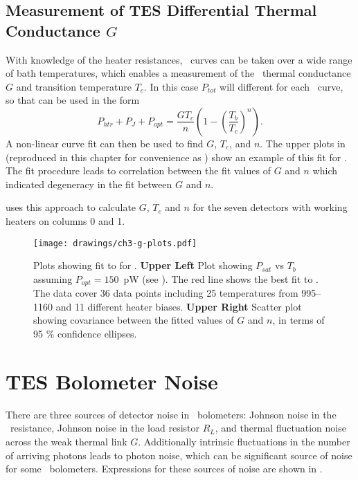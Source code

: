 \subsection{Measurement of \textsc{TES} Differential Thermal Conductance $G$}

With knowledge of the heater resistances, \IV\ curves can be taken over a wide range of bath temperatures, which enables a measurement of the \TES\ thermal conductance $G$ and transition temperature $T_c$.
In this case $P_{tot}$ will different for each \IV\ curve, so that  can be used in the form
\begin{equation}\label{eqn:ch3-g-fit}
P_{htr} + P_J + P_{opt}= \frac{G T_c}{n}\left(1 - \left(\frac{T_b}{T_c}\right)^n\right).
\end{equation}
A non-linear curve fit can then be used to find $G$, $T_c$, and $n$.
The upper plots in  (reproduced in this chapter for convenience as ) show an example of this fit for .
The fit procedure leads to correlation between the fit values of $G$ and $n$ which indicated degeneracy in the fit between $G$ and $n$.

 uses this approach to calculate $G$, $T_c$ and $n$ for the seven detectors with working heaters on columns 0 and 1.

\begin{figure*}
\texttt{[image: drawings/ch3-g-plots.pdf]}
\caption{Plots showing fit to  for .
\textbf{Upper Left} Plot showing $P_{sat}$ vs $T_b$ assuming $P_{opt} = 150$~pW (see ).
The red line shows the best fit to .
The data cover 36 data points including 25 temperatures from \SIrange{995}{1160}{\mK} and 11 different heater biases.
\textbf{Upper Right} Scatter plot showing covariance between the fitted values of $G$ and $n$, in terms of 95 \% confidence ellipses.} 
\label{fig:ch3-g-plots}
\end{figure*}

\section{\textsc{TES} Bolometer Noise}

There are three sources of detector noise in \TES\ bolometers: Johnson noise in the \TES\ resistance, Johnson noise in the load resistor $R_L$, and thermal fluctuation noise across the weak thermal link $G$.
Additionally intrinsic fluctuations in the number of arriving photons leads to photon noise, which can be significant source of noise for some \TES\ bolometers.
Expressions for these sources of noise are shown in .

